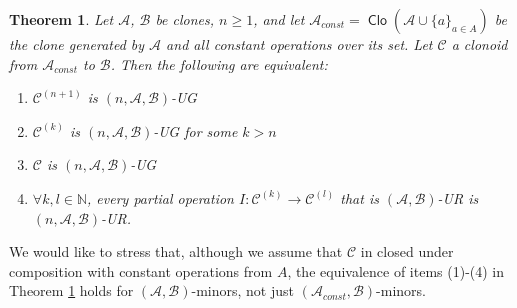 \documentclass[11pt]{amsart}
\theoremstyle{plain}
\newtheorem{theorem}[thm]{Theorem}
\theoremstyle{definition}
\newcommand{\N}{{\mathbb N}}
\newcommand{\clone}[1]{\mathcal{#1}}
\newcommand{\clonoid}[1]{\mathcal{#1}}
\newcommand{\clodC}{\clonoid{C}}
\newcommand{\clodO}{\clonoid{O}}
\newcommand{\cloA}{\clone{A}}
\newcommand{\cloB}{\clone{B}}
\DeclareMathOperator{\Clo}{\mathsf{Clo}}
\begin{document}
\begin{theorem} \label{theorem:unigen}
Let $\cloA$, $\cloB$ be clones, $n \geq 1$, and let $\cloA_{const} = \Clo(\cloA \cup \{a\}_{a\in A})$ be the clone generated by $\cloA$ and all constant operations over its set. Let $\clodC$ a clonoid from $\cloA_{const}$
to $\cloB$. Then the following are equivalent:
\begin{enumerate}
\item\label{ite:th_unigen1} $\clodC^{(n+1)}$ is $(n,\cloA,\cloB)$-UG
\item\label{ite:th_unigen2} $\clodC^{(k)}$ is $(n,\cloA,\cloB)$-UG for some $k>n$
\item\label{ite:th_unigen3} $\clodC$ is $(n,\cloA,\cloB)$-UG
\item\label{ite:th_unigen4} $\forall k,l \in \N$, every partial operation $I \colon \clodC^{(k)} \to \clodC^{(l)}$ 
that is $(\cloA,\cloB)$-UR is $(n,\cloA,\cloB)$-UR.
\end{enumerate}
\end{theorem}

We would like to stress that, although we assume that $\clodC$ in closed under composition with constant operations from $A$, the equivalence of items (1)-(4) in Theorem \ref{theorem:unigen} holds for $(\cloA, \cloB)$-minors, not just $(\cloA_{const}, \cloB)$-minors. %
\end{document}
